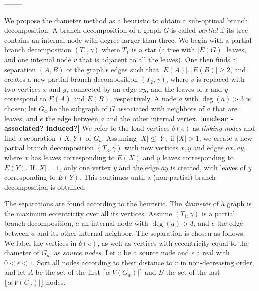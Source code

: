 --------

We propose the diameter method \cite{misc:Hicks04} as a heuristic to obtain a sub-optimal branch decomposition.
A branch decomposition of a graph $G$ is called {\em partial} if its tree contains an internal node with degree larger than three. 
We begin with a partial branch decomposition $(T_1, \gamma)$ where $T_1$ is a star (a tree with $|E(G)|$ leaves, and one internal node $v$ that is adjacent to all the leaves).
One then finds a separation $(A,B)$ of the graph's edges such that $|E(A)|, |E(B)| \geq 2$, and creates a new partial branch decomposition $(T_2, \gamma)$, where $v$ is replaced with two vertices $x$ and $y$, connected by an edge $xy$, and the leaves of $x$ and $y$ correspond to $E(A)$ and $E(B)$, respectively.
A node $a$ with $\deg(a)>3$ is chosen; let $G_a$ be the subgraph of $G$ associated with neighbors of $a$ that are leaves, and $e$ the edge between $a$ and the other internal vertex. \textbf{[unclear - associated? induced?]}
We refer to the load vertices $\delta(e)$ as {\em linking nodes} and find a separation $(X,Y)$ of $G_a$.
Assuming $|X| \leq |Y|$, if $|X|>1$, we create a new partial branch decomposition $(T_3, \gamma)$ with new vertices $x,y$ and edges $ax, ay$, where $x$ has leaves corresponding to $E(X)$ and $y$ leaves corresponding to $E(Y)$.
If $|X|=1$, only one vertex $y$ and the edge $ay$ is created, with leaves of $y$ corresponding to $E(Y)$.
This continues until a (non-partial) branch decomposition is obtained.

The separations are found according to the heuristic.
The {\em diameter} of a graph is the maximum eccentricity over all its vertices.
Assume $(T_i, \gamma)$ is a partial branch decomposition, $a$ an internal node with $\deg(a) > 3$, and $e$ the edge between $a$ and its other internal neighbor.
The separation is chosen as follows.
We label the vertices in $\delta(e)$, as well as vertices with eccentricity equal to the diameter of $G_a$, as {\em source nodes}.
Let $v$ be a source node and $\epsilon$ a real with $0 < \epsilon < 1$.
Sort all nodes according to their distance to $v$ in non-decreasing order, and let $A$ be the set of the first $\lceil \alpha |V(G_a)| \rceil$ and $B$ the set of the last $\lfloor \alpha |V(G_a)| \rfloor$ nodes.

